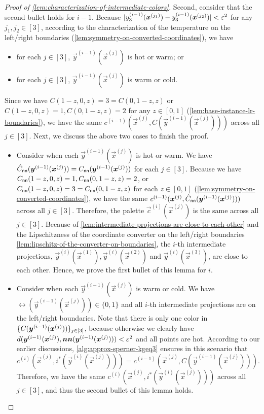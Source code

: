 \begin{proof}[Proof of \cref{lem:characterization-of-intermediate-colors}]
    Second, consider that the second bullet holds for $i-1$. 
    Because $|y_3^{(i-1)}(\vec{x}^{(j_1)})-y_3^{(i-1)}(\vec{x}^{(j_2)})|<\eps^{2}$ for any $j_1,j_2\in [3]$, according to the characterization of the temperature on the left/right boundaries (\cref{lem:symmetry-on-converted-coordinates}), we have 
    \begin{itemize}[itemsep=0.2em,topsep=0.5em]
        \item for each $j\in [3]$, $\vec{y}^{(i-1)}(\vec{x}^{(j)})$ is hot or warm; or 
        \item for each $j\in [3]$, $\vec{y}^{(i-1)}(\vec{x}^{(j)})$ is warm or cold. 
    \end{itemize}
    Since we have $C(1-z,0,z)=3=C(0,1-z,z)$ or $C(1-z,0,z)=1, C(0,1-z,z)=2$ for any $z\in [0,1]$ (\cref{lem:base-instance-lr-boundaries}), we have the same $c^{(i-1)}(\vec{x}^{(j)},C(\vec{y}^{(i-1)}(\vec{x}^{(j)})))$ across all $j\in [3]$.
    Next, we discuss the above two cases to finish the proof. 
    \begin{itemize}[itemsep=0.2em,topsep=0.5em]
        \item Consider when each $\vec{y}^{(i-1)}(\vec{x}^{(j)})$ is hot or warm. We have $\hat{C}_{\sf nn}(\vec{y}^{(i-1)}(\vec{x}^{(j)}))=C_{\sf nn}(\vec{y}^{(i-1)}(\vec{x}^{(j)}))$ for each $j\in [3]$. Because we have $C_{\sf nn}(1-z,0,z)=1, C_{\sf nn}(0,1-z,z)=2$, or $C_{\sf nn}(1-z,0,z)=3=C_{\sf nn}(0,1-z,z)$ for each $z\in [0,1]$ (\cref{lem:symmetry-on-converted-coordinates}), we have the same $c^{(i-1)}(\vec{x}^{(j)},\hat{C}_{\sf nn}(\vec{y}^{(i-1)}(\vec{x}^{(j)})))$ across all $j\in [3]$.
        Therefore, the palette $\vec{c}^{(i)}(\vec{x}^{(j)})$ is the same across all $j\in [3]$. 
        Because of \cref{lem:intermediate-projections-are-close-to-each-other} and the Lipschitzness of the coordinate converter on the left/right boundaries \cref{lem:lipschitz-of-the-converter-on-boundaries}, the $i$-th intermediate projections, $\vec{y}^{(i)}(\vec{x}^{(1)}), \vec{y}^{(i)}(\vec{x}^{(2)})$ and $\vec{y}^{(i)}(\vec{x}^{(3)})$, are close to each other. 
        Hence, we prove the first bullet of this lemma for $i$. 
        \item Consider when each $\vec{y}^{(i-1)}(\vec{x}^{(j)})$ is warm or cold. We have $\rel(\vec{y}^{(i-1)}(\vec{x}^{(j)}))\in \{0,1\}$ and all $i$-th intermediate projections are on the left/right boundaries. 
        Note that there is only one color in $\settxt{C(\vec{y}^{(i-1)}(\vec{x}^{(j)}))}_{j\in [3]}$, because otherwise we clearly have $d(\vec{y}^{(i-1)}(\vec{x}^{(j)}),\nn(\vec{y}^{(i-1)}(\vec{x}^{(j)})))<\eps^2$ and all points are hot. 
        According to our earlier discussions, \cref{alg:approx-sperner-kgeq3} ensures in this scenario that $c^{(i)}(\vec{x}^{(j)}, i^*(\vec{y}^{(i)}(\vec{x}^{(j)}))) = c^{(i-1)}(\vec{x}^{(j)}, C(\vec{y}^{(i-1)}(\vec{x}^{(j)})))$.
        Therefore, we have the same $c^{(i)}(\vec{x}^{(j)}, i^*(\vec{y}^{(i)}(\vec{x}^{(j)})))$ across all $j\in [3]$, and thus the second bullet of this lemma holds. \qedhere
    \end{itemize}
\end{proof}


